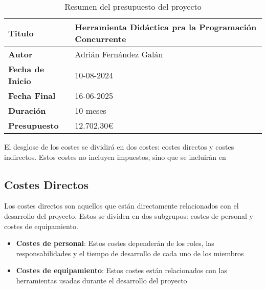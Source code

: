 \begin{table}[htbp]
    \centering
    \caption{Resumen del presupuesto del proyecto}
    \label{tab:resumen_presupuesto}
    \begin{tabular}{@{}l|l@{}}
    \toprule
    \textbf{Titulo}          & Herramienta Didáctica pra la Programación Concurrente \\ \midrule
    \textbf{Autor}           & Adrián Fernández Galán                                \\ \midrule
    \textbf{Fecha de Inicio} & 10-08-2024                                            \\ \midrule
    \textbf{Fecha Final}     & 16-06-2025                                            \\ \midrule
    \textbf{Duración}        & 10 meses                                              \\ \midrule
    \textbf{Presupuesto}     & 12.702,30\euro                                            \\ \bottomrule
    \end{tabular}
\end{table}

El desglose de los costes se dividirá en dos costes: costes directos y costes indirectos. Estos costes no incluyen impuestos, sino que se incluirán en 

\subsection{Costes Directos}\label{subsec:costes_directos}

Los costes directos son aquellos que están directamente relacionados con el desarrollo del proyecto. Estos se dividen en dos subgrupos: costes de personal y costes de equipamiento.
\begin{itemize}
    \item \textbf{Costes de personal}: Estos costes dependerán de los roles, las responsabilidades y el tiempo de desarrollo de cada uno de los miembros
    \item \textbf{Costes de equipamiento}: Estos costes están relacionados con las herramientas usadas durante el desarrollo del proyecto
\end{itemize}

